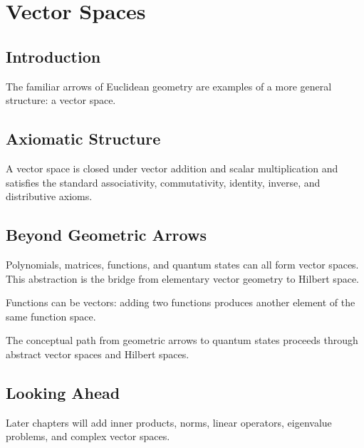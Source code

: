 \section{Vector Spaces}
\label{sec:vector-spaces}
\subsection{Introduction}
The familiar arrows of Euclidean geometry are examples of a more general structure: a vector space.
\subsection{Axiomatic Structure}
A vector space is closed under vector addition and scalar multiplication and satisfies the standard associativity, commutativity, identity, inverse, and distributive axioms.
\subsection{Beyond Geometric Arrows}
Polynomials, matrices, functions, and quantum states can all form vector spaces. This abstraction is the bridge from elementary vector geometry to Hilbert space.
\begin{bookfigure}{Functions can be vectors: adding two functions produces another element of the same function space.}

\label{fig:function-vector-space}
\end{bookfigure}

\begin{bookfigure}{The conceptual path from geometric arrows to quantum states proceeds through abstract vector spaces and Hilbert spaces.}

\label{fig:hilbert-space-bridge}
\end{bookfigure}

\subsection{Looking Ahead}
Later chapters will add inner products, norms, linear operators, eigenvalue problems, and complex vector spaces.
